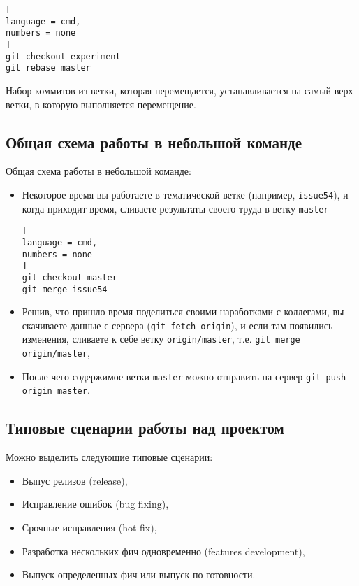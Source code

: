 \documentclass[%
	11pt,
	a4paper,
	utf8,
		]{article}
\begin{document}
\begin{lstlisting}[
language = cmd,
numbers = none
]
git checkout experiment
git rebase master
\end{lstlisting}

Набор коммитов из ветки, которая перемещается, устанавливается на самый верх ветки, в которую выполняется перемещение.

\subsection{Общая схема работы в небольшой команде}

Общая схема работы в небольшой команде:
\begin{itemize}
	\item Некоторое время вы работаете в тематической ветке (например, \texttt{issue54}), и когда приходит время, сливаете результаты своего труда в ветку \texttt{master}
	
\begin{lstlisting}[
language = cmd,
numbers = none
]
git checkout master
git merge issue54
\end{lstlisting}
	
	\item Решив, что пришло время поделиться своими наработками с коллегами, вы скачиваете данные с сервера (\texttt{git fetch origin}), и если там появились изменения, сливаете к себе ветку \texttt{origin/master}, т.е. \texttt{git merge origin/master},
	
	\item После чего содержимое ветки \texttt{master} можно отправить на сервер \texttt{git push origin master}.
\end{itemize}

\subsection{Типовые сценарии работы над проектом}

Можно выделить следующие типовые сценарии:
\begin{itemize}
	\item Выпус релизов (release),
	
	\item Исправление ошибок (bug fixing),
	
	\item Срочные исправления (hot fix),
	
	\item Разработка нескольких фич одновременно (features development),
	
	\item Выпуск определенных фич или выпуск по готовности.
\end{itemize}
\end{document}

